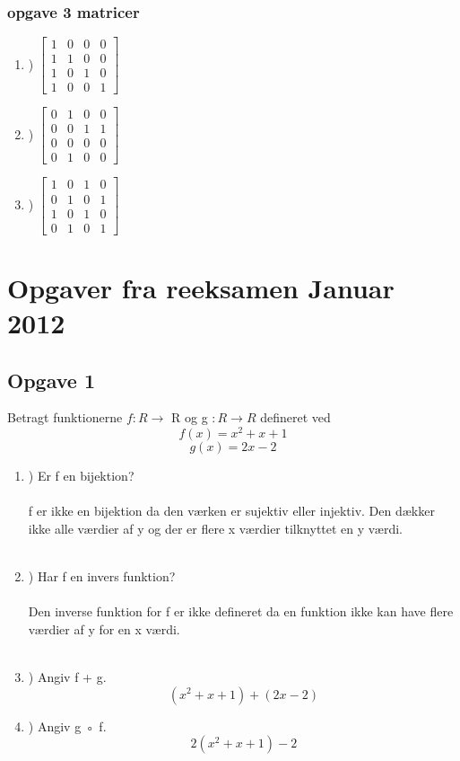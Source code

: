 \documentclass[a4paper,12pt]{article}
\begin{document}
\subsubsection{opgave 3 matricer}
\begin{enumerate}
	\item) \(\begin{bmatrix}
			1 & 0 & 0 & 0\\
			1 & 1 & 0 & 0\\
			1 & 0 & 1 & 0\\
			1 & 0 & 0 & 1
			\end{bmatrix}\)
			
	\item) \(\begin{bmatrix}
			0 & 1 & 0 & 0\\
			0 & 0 & 1 & 1\\
			0 & 0 & 0 & 0\\
			0 & 1 & 0 & 0
			\end{bmatrix}\)
			
	\item) \(\begin{bmatrix}
			1 & 0 & 1 & 0\\
			0 & 1 & 0 & 1\\
			1 & 0 & 1 & 0\\
			0 & 1 & 0 & 1
			\end{bmatrix}\)
\end{enumerate}


\section{Opgaver fra reeksamen Januar 2012}
\subsection{Opgave 1}
Betragt funktionerne $f : R \longrightarrow$ R og g $: R \longrightarrow R $ defineret ved 
$$f(x) = x^2 + x + 1$$
$$g(x) = 2x - 2$$
\begin{enumerate}

\item) Er f en bijektion?  \\\\
f er ikke en bijektion da den værken er sujektiv eller injektiv. Den dækker ikke alle værdier af y og der er flere x værdier tilknyttet en y værdi.
\\
\\
\item) Har f en invers funktion?
\\
\\
Den inverse funktion for f er ikke defineret da en funktion ikke kan have flere værdier af y for en x værdi.
\\
\\
\item) Angiv f + g.
$$(x^2 + x + 1) + (2x-2)$$
\item) Angiv g ◦ f.
$$2(x^2+x+1) - 2$$
\end{enumerate}
\end{document}
